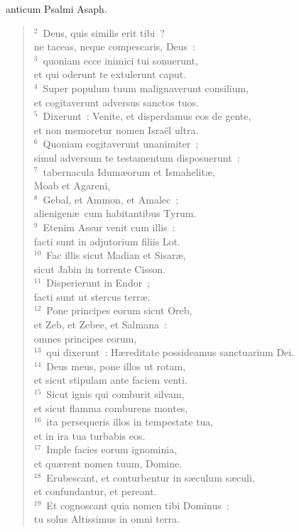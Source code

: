\bchapter
{}anticum Psalmi Asaph.
\begin{flushleft}\begin{verse}\vspace{6pt}${}^{2}$~Deus, quis similis erit tibi~?\\ ne taceas, neque compescaris, Deus~:\\
${}^{3}$~quoniam ecce inimici tui sonuerunt,\\ et qui oderunt te extulerunt caput.\\
${}^{4}$~Super populum tuum malignaverunt consilium,\\ et cogitaverunt adversus sanctos tuos.\\
${}^{5}$~Dixerunt~: Venite, et disperdamus eos de gente,\\ et non memoretur nomen Isra\"el ultra.\\
${}^{6}$~Quoniam cogitaverunt unanimiter~;\\ simul adversum te testamentum disposuerunt~:\\
${}^{7}$~tabernacula Idum\ae orum et Ismahelit\ae ,\\ Moab et Agareni,\\
${}^{8}$~Gebal, et Ammon, et Amalec~;\\ alienigen\ae\ cum habitantibus Tyrum.\\
${}^{9}$~Etenim Assur venit cum illis~:\\ facti sunt in adjutorium filiis Lot.\\
${}^{10}$~Fac illis sicut Madian et Sisar\ae ,\\ sicut Jabin in torrente Cisson.\\
${}^{11}$~Disperierunt in Endor~;\\ facti sunt ut stercus terr\ae .\\
${}^{12}$~Pone principes eorum sicut Oreb,\\ et Zeb, et Zebee, et Salmana~:\\ omnes principes eorum,\\
${}^{13}$~qui dixerunt~: H\ae reditate possideamus sanctuarium Dei.\\
${}^{14}$~Deus meus, pone illos ut rotam,\\ et sicut stipulam ante faciem venti.\\
${}^{15}$~Sicut ignis qui comburit silvam,\\ et sicut flamma comburens montes,\\
${}^{16}$~ita persequeris illos in tempestate tua,\\ et in ira tua turbabis eos.\\
${}^{17}$~Imple facies eorum ignominia,\\ et qu\ae rent nomen tuum, Domine.\\
${}^{18}$~Erubescant, et conturbentur in s\ae culum s\ae culi,\\ et confundantur, et pereant.\\
${}^{19}$~Et cognoscant quia nomen tibi Dominus~:\\ tu solus Altissimus in omni terra.\end{verse}\end{flushleft}




